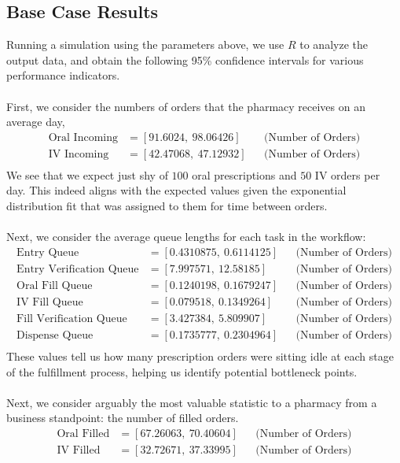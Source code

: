 \documentclass[10pt]{report}            %
\begin{document}
\subsection*{Base Case Results}
Running a simulation using the parameters above, we use $R$ to analyze the output data, and obtain the following 95\% confidence intervals for various performance indicators.\\\hfill\\
First, we consider the numbers of orders that the pharmacy receives on an average day,
\begin{align*}
\text{Oral Incoming} &= [91.6024,\ 98.06426] && \text{(Number of Orders)}\\
\text{IV Incoming} &= [42.47068,\ 47.12932] && \text{(Number of Orders)}\\
\end{align*}
We see that we expect just shy of $100$ oral prescriptions and $50$ IV orders per day. This indeed aligns with the expected values given the exponential distribution fit that was assigned to them for time between orders.\\\hfill\\
Next, we consider the average queue lengths for each task in the workflow:
\begin{align*}
\text{Entry Queue} &= [0.4310875,\ 0.6114125] && \text{(Number of Orders)}\\
\text{Entry Verification Queue} &= [7.997571,\ 12.58185] && \text{(Number of Orders)}\\
\text{Oral Fill Queue} &= [0.1240198,\ 0.1679247] && \text{(Number of Orders)}\\
\text{IV Fill Queue} &= [0.079518,\ 0.1349264] && \text{(Number of Orders)}\\
\text{Fill Verification Queue} &= [3.427384,\ 5.809907] && \text{(Number of Orders)}\\
\text{Dispense Queue} &= [0.1735777,\ 0.2304964] && \text{(Number of Orders)}\\
\end{align*}
These values tell us how many prescription orders were sitting idle at each stage of the fulfillment process, helping us identify potential bottleneck points.\\\hfill\\
Next, we consider arguably the most valuable statistic to a pharmacy from a business standpoint: the number of filled orders. 
\begin{align*}
\text{Oral Filled} &= [67.26063,\ 70.40604] && \text{(Number of Orders)}\\
\text{IV Filled} &= [32.72671,\ 37.33995] && \text{(Number of Orders)}\\
\end{align*}
\end{document}

